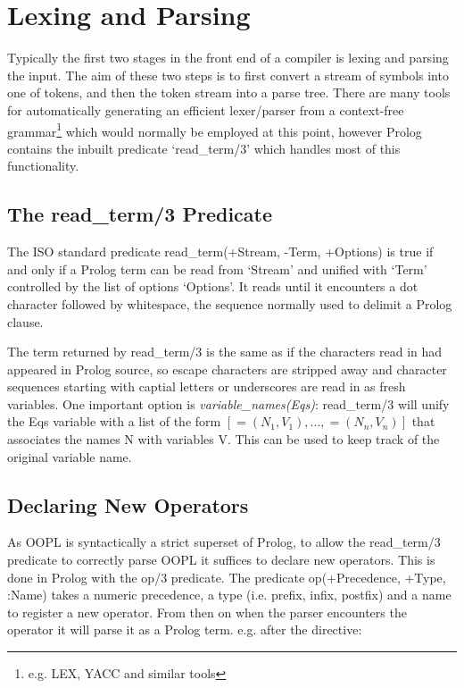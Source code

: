 \documentclass[12pt,a4paper,twoside,openright]{report}
\begin{document}
\section{Lexing and Parsing}

Typically the first two stages in the front end of a compiler is lexing and parsing the input\cite{DRAGON}. The aim of these two steps is to first convert a stream of symbols into one of tokens, and then the token stream into a parse tree. There are many tools for automatically generating an efficient lexer/parser from a context-free grammar\footnote{e.g. LEX, YACC and similar tools} which would normally be employed at this point, however Prolog contains the inbuilt predicate `read_term/3' which handles most of this functionality.

\subsection{The read_term/3 Predicate}

The ISO standard\cite{ISOPROLOG} predicate read_term(+Stream, -Term, +Options) is true if and only if a Prolog term can be read from `Stream' and unified with `Term' controlled by the list of options `Options'. It reads until it encounters a dot character followed by whitespace, the sequence normally used to delimit a Prolog clause.

\bigskip

The term returned by read_term/3 is the same as if the characters read in had appeared in Prolog source, so escape characters are stripped away and character sequences starting with captial letters or underscores are read in as fresh variables. One important option is \emph{variable_names(Eqs)}: read_term/3 will unify the Eqs variable with a list of the form $[=(N_1, V_1), ..., =(N_n, V_n)]$ that associates the names N with variables V. This can be used to keep track of the original variable name.

\subsection{Declaring New Operators}

As OOPL is syntactically a strict superset of Prolog, to allow the read_term/3 predicate to correctly parse OOPL it suffices to declare new operators. This is done in Prolog with the op/3 predicate. The predicate op(+Precedence, +Type, :Name) takes a numeric precedence, a type (i.e. prefix, infix, postfix) and a name to register a new operator. From then on when the parser encounters the operator it will parse it as a Prolog term. e.g. after the directive:
\end{document}

